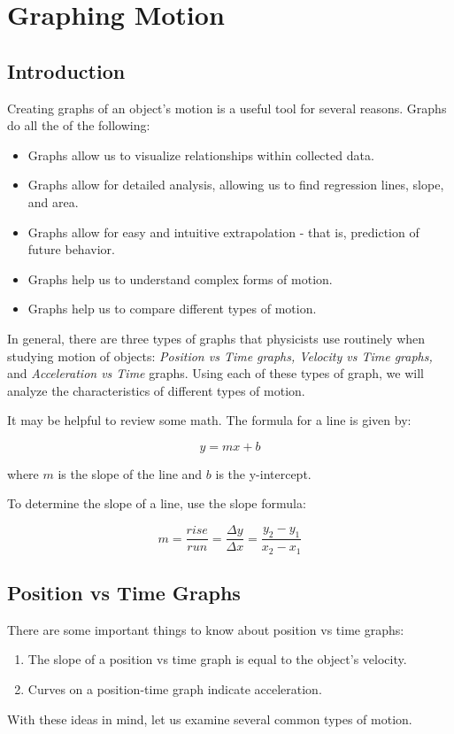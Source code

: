 \chapter{Graphing Motion}

	\section{Introduction}
	Creating graphs of an object's motion is a useful tool for several reasons.  Graphs do all the of the following:
	\begin{itemize}
		\item Graphs allow us to visualize relationships within collected data.
		\item Graphs allow for detailed analysis, allowing us to find regression lines, slope, and area.
		\item Graphs allow for easy and intuitive extrapolation - that is, prediction of future behavior.
		\item Graphs help us to understand complex forms of motion.
		\item Graphs help us to compare different types of motion.
	\end{itemize}

In general, there are three types of graphs that physicists use routinely when studying motion of objects: \textit{Position vs Time graphs, Velocity vs Time graphs,} and \textit{Acceleration vs Time} graphs.  Using each of these types of graph, we will analyze the characteristics of different types of motion.

It may be helpful to review some math.  The formula for a line is given by:
\begin{mdframed}[backgroundcolor=orange!20!white]
\begin{equation}
	y = m x +b
\end{equation}
\end{mdframed}

where $m$ is the slope of the line and $b$ is the y-intercept.

To determine the slope of a line, use the slope formula: 
\begin{mdframed}[backgroundcolor=orange!20!white]
	\begin{equation}
		m = \frac{rise}{run} = \frac{\Delta y} {\Delta x} = \frac{y_2-y_1}{x_2-x_1}
	\end{equation}
\end{mdframed}


\newpage
	\section{Position vs Time Graphs}
	There are some important things to know about position vs time graphs:
	\begin{enumerate}
		\item The slope of a position vs time graph is equal to the object's velocity. 
		\item Curves on a position-time graph indicate acceleration.
	\end{enumerate}
With these ideas in mind, let us examine several common types of motion.  

